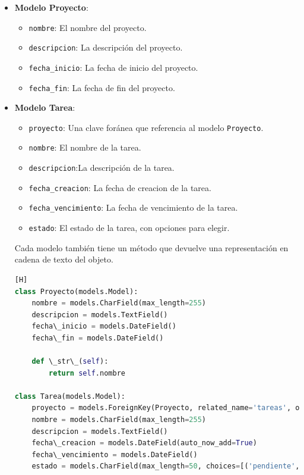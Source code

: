 \documentclass{article}
\begin{document}
\begin{itemize}
    \item \textbf{Modelo Proyecto}:
    \begin{itemize}
        \item \texttt{nombre}: El nombre del proyecto.
        \item \texttt{descripcion}: La descripción del proyecto.
        \item \texttt{fecha\_inicio}: La fecha de inicio del proyecto.
        \item \texttt{fecha\_fin}: La fecha de fin del proyecto.
    \end{itemize}

    \item \textbf{Modelo Tarea}:
    \begin{itemize}
        \item \texttt{proyecto}: Una clave foránea que referencia al modelo \texttt{Proyecto}.
        \item \texttt{nombre}: El nombre de la tarea.
        \item \texttt{descripcion}:La descripción de la tarea.
        \item \texttt{fecha\_creacion}: La fecha de creacion de la tarea.
        \item \texttt{fecha\_vencimiento}: La fecha de vencimiento de la tarea.
        \item \texttt{estado}: El estado de la tarea, con opciones para elegir.
    \end{itemize}

Cada modelo también tiene un método que devuelve una representación en cadena de texto del objeto.

    \begin{lstlisting}[language=Python,caption={models.py}][H]
class Proyecto(models.Model):
    nombre = models.CharField(max_length=255)
    descripcion = models.TextField()
    fecha\_inicio = models.DateField()
    fecha\_fin = models.DateField()

    def \_str\_(self):
        return self.nombre

class Tarea(models.Model):
    proyecto = models.ForeignKey(Proyecto, related_name='tareas', on_delete=models.CASCADE)
    nombre = models.CharField(max_length=255)
    descripcion = models.TextField()
    fecha\_creacion = models.DateField(auto_now_add=True)
    fecha\_vencimiento = models.DateField()
    estado = models.CharField(max_length=50, choices=[('pendiente', 'Pendiente'), ('en_progreso', 'En Progreso'), ('completada', 'Completada')])


\end{lstlisting}
\end{itemize}
\end{document}
